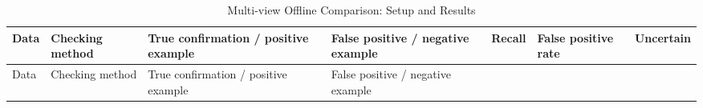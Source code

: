 \FloatBarrier\begingroup\small\setlength{\tabcolsep}{2.5pt}
\begin{longtable}[]{@{}
  >{\raggedright\arraybackslash}p{}
  >{\raggedright\arraybackslash}p{}
  >{\raggedleft\arraybackslash}p{}
  >{\raggedleft\arraybackslash}p{}
  >{\raggedleft\arraybackslash}p{}
  >{\raggedleft\arraybackslash}p{}
  >{\raggedleft\arraybackslash}p{}@{}}
\caption{Multi-view Offline Comparison: Setup and Results}\label{tab:s13-10}\tabularnewline
\toprule\noalign{}
\begin{minipage}[b]{\linewidth}\raggedright
Data
\end{minipage} & \begin{minipage}[b]{\linewidth}\raggedright
Checking method
\end{minipage} & \begin{minipage}[b]{\linewidth}\raggedleft
True confirmation / positive example
\end{minipage} & \begin{minipage}[b]{\linewidth}\raggedleft
False positive / negative example
\end{minipage} & \begin{minipage}[b]{\linewidth}\raggedleft
Recall
\end{minipage} & \begin{minipage}[b]{\linewidth}\raggedleft
False positive rate
\end{minipage} & \begin{minipage}[b]{\linewidth}\raggedleft
Uncertain
\end{minipage} \\
\midrule\noalign{}
\endfirsthead
\toprule\noalign{}
\begin{minipage}[b]{\linewidth}\raggedright
Data
\end{minipage} & \begin{minipage}[b]{\linewidth}\raggedright
Checking method
\end{minipage} & \begin{minipage}[b]{\linewidth}\raggedleft
True confirmation / positive example
\end{minipage} & \begin{minipage}[b]{\linewidth}\raggedleft
False positive / negative example
\end{minipage} & \begin{minipage}[b]{\linewidth}\raggedleft

\end{minipage}
\end{longtable}
